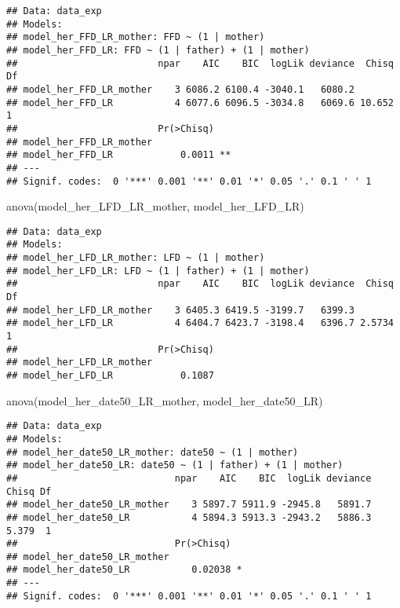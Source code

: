 \documentclass[
]{article}
\newenvironment{Shaded}{\begin{snugshade}}{\end{snugshade}}
\newcommand{\FunctionTok}[1]{\textcolor[rgb]{0.00,0.00,0.00}{#1}}
\newcommand{\NormalTok}[1]{#1}
\begin{document}
\begin{verbatim}
## Data: data_exp
## Models:
## model_her_FFD_LR_mother: FFD ~ (1 | mother)
## model_her_FFD_LR: FFD ~ (1 | father) + (1 | mother)
##                         npar    AIC    BIC  logLik deviance  Chisq Df
## model_her_FFD_LR_mother    3 6086.2 6100.4 -3040.1   6080.2          
## model_her_FFD_LR           4 6077.6 6096.5 -3034.8   6069.6 10.652  1
##                         Pr(>Chisq)   
## model_her_FFD_LR_mother              
## model_her_FFD_LR            0.0011 **
## ---
## Signif. codes:  0 '***' 0.001 '**' 0.01 '*' 0.05 '.' 0.1 ' ' 1
\end{verbatim}

\begin{Shaded}
\begin{Highlighting}[]
\FunctionTok{anova}\NormalTok{(model\_her\_LFD\_LR\_mother, model\_her\_LFD\_LR)}
\end{Highlighting}
\end{Shaded}

\begin{verbatim}
## Data: data_exp
## Models:
## model_her_LFD_LR_mother: LFD ~ (1 | mother)
## model_her_LFD_LR: LFD ~ (1 | father) + (1 | mother)
##                         npar    AIC    BIC  logLik deviance  Chisq Df
## model_her_LFD_LR_mother    3 6405.3 6419.5 -3199.7   6399.3          
## model_her_LFD_LR           4 6404.7 6423.7 -3198.4   6396.7 2.5734  1
##                         Pr(>Chisq)
## model_her_LFD_LR_mother           
## model_her_LFD_LR            0.1087
\end{verbatim}

\begin{Shaded}
\begin{Highlighting}[]
\FunctionTok{anova}\NormalTok{(model\_her\_date50\_LR\_mother, model\_her\_date50\_LR)}
\end{Highlighting}
\end{Shaded}

\begin{verbatim}
## Data: data_exp
## Models:
## model_her_date50_LR_mother: date50 ~ (1 | mother)
## model_her_date50_LR: date50 ~ (1 | father) + (1 | mother)
##                            npar    AIC    BIC  logLik deviance Chisq Df
## model_her_date50_LR_mother    3 5897.7 5911.9 -2945.8   5891.7         
## model_her_date50_LR           4 5894.3 5913.3 -2943.2   5886.3 5.379  1
##                            Pr(>Chisq)  
## model_her_date50_LR_mother             
## model_her_date50_LR           0.02038 *
## ---
## Signif. codes:  0 '***' 0.001 '**' 0.01 '*' 0.05 '.' 0.1 ' ' 1
\end{verbatim}
\end{document}
